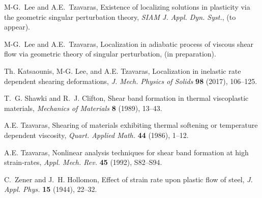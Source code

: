 \documentclass[graybox]{svmult}
\begin{document}
\begin{thebibliography}{10}
{\sc M-G.~Lee and A.E.~Tzavaras},
Existence of localizing solutions in plasticity via the geometric singular perturbation theory, 
{\em SIAM J. Appl. Dyn. Syst.}, (to appear).

{\sc M-G.~Lee and A.E.~Tzavaras},
Localization in adiabatic process of viscous shear flow via geometric theory of singular perturbation, (in preparation).

{\sc Th. Katsaounis, M-G. Lee, and A.E. Tzavaras}, 
Localization in inelastic rate dependent shearing deformations, 
{\em J.  Mech. Physics of Solids} {\bf 98} (2017), 106--125.


{\sc T.~G. Shawki and R.~J. Clifton}, 
Shear band formation in thermal viscoplastic materials, 
{\em Mechanics of Materials} {\bf 8 } (1989), 13--43.

{\sc A.E. Tzavaras},
Shearing of materials exhibiting thermal softening or temperature dependent viscosity,
{\em Quart.  Applied Math.} {\bf 44} (1986), 1--12.


{\sc A.E. Tzavaras}, 
Nonlinear analysis techniques for shear band formation at high strain-rates, 
{\it Appl. Mech. Rev.}
{\bf  45} (1992), S82--S94.


{\sc C.~Zener and J.~H. Hollomon}, 
Effect of strain rate upon plastic flow of steel,
{\it J. Appl. Phys.}
{\bf 15} (1944), 22--32.
\end{thebibliography}
\end{document}
